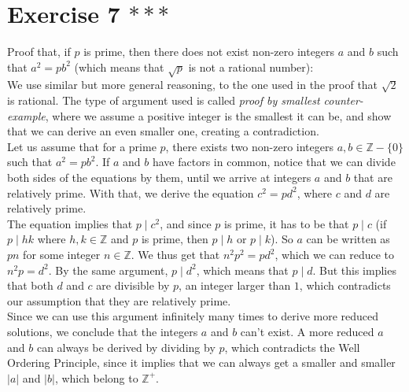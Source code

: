\documentclass[12pt]{article}
\newcommand{\Z}{\mathbb{Z}}
\begin{document}
    \section*{Exercise 7  $***$}
    Proof that, if $p$ is prime, 
    then there does not exist non-zero integers $a$ and $b$
    such that $a^2 = pb^2$
    (which means that $\sqrt{p}$ is not a rational number): \\
    We use similar but more general reasoning,
    to the one used in the proof that $\sqrt{2}$ is rational.
    The type of argument used is called
    \textit{proof by smallest counter-example},
    where we assume a positive integer is the smallest it can be,
    and show that we can derive an even smaller one,
    creating a contradiction. \\
    Let us assume that for a prime $p$,
    there exists two non-zero integers $a, b \in \Z - \{0\}$ 
    such that $a^2 = pb^2$.
    If $a$ and $b$ have factors in common,
    notice that we can divide both sides of the equations by them,
    until we arrive at integers $a$ and $b$ that are relatively prime.
    With that, we derive the equation $c^2 = pd^2$,
    where $c$ and $d$ are relatively prime. \\
    The equation implies that $p \mid c^2$,
    and since $p$ is prime, 
    it has to be that $p \mid c$
    (if $p \mid hk$ where $h, k \in \Z$ and $p$ is prime,
    then $p \mid h$ or $p \mid k$).
    So $a$ can be written as $pn$ for some integer $n \in \Z$.
    We thus get that $n^2p^2 = pd^2$,
    which we can reduce to $n^2p = d^2$.
    By the same argument, $p \mid d^2$,
    which means that $p \mid d$.
    But this implies that both $d$ and $c$ are divisible by $p$,
    an integer larger than $1$,
    which contradicts our assumption that they are relatively prime. \\
    Since we can use this argument infinitely many times
    to derive more reduced solutions,
    we conclude that the integers $a$ and $b$ can't exist.
    A more reduced $a$ and $b$ can always be derived
    by dividing by $p$,
    which contradicts the Well Ordering Principle,
    since it implies that we can always get a smaller and smaller
    $|a|$ and $|b|$, which belong to $\Z^+$. \\
\end{document}
